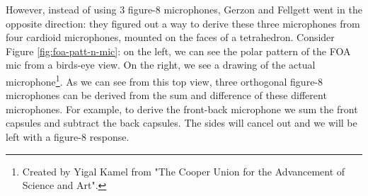 However, instead of using 3 figure-8 microphones, Gerzon and Fellgett went in the opposite direction: they figured out a way to derive these three microphones from four cardioid microphones, mounted on the faces of a tetrahedron. Consider Figure \ref{fig:foa-patt-n-mic}: on the left, we can see the polar pattern of the FOA mic from a birds-eye view. On the right, we see a drawing of the actual microphone\footnote{Created by Yigal Kamel from "The Cooper Union for the Advancement of Science and Art".}. As we can see from this top view, three orthogonal figure-8 microphones can be derived from the sum and difference of these different microphones. For example, to derive the front-back microphone we sum the front capsules and subtract the back capsules. The sides will cancel out and we will be left with a figure-8 response. 

